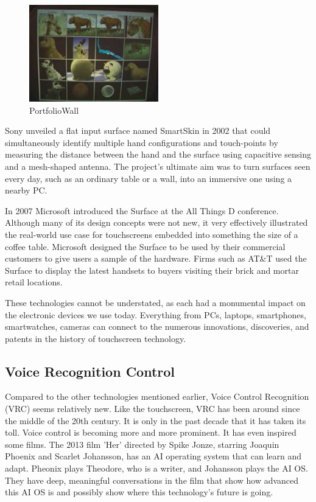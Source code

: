 \documentclass{article}
\begin{document}
\begin{figure}[!ht]
    \caption{PortfolioWall}
    \label{image:PFW}
    \centering
    \includegraphics[width=0.5\textwidth]{pics/pf_wall.jpg}
\end{figure}

Sony unveiled a flat input surface named SmartSkin in 2002 that could simultaneously identify multiple hand configurations and touch-points by measuring the distance between the hand and the surface using capacitive sensing and a mesh-shaped antenna.
The project’s ultimate aim was to turn surfaces seen every day, such as an ordinary table or a wall, into an immersive one using a nearby PC.

In 2007 Microsoft introduced the Surface at the All Things D conference. Although many of its design concepts were not new, it very effectively illustrated the real-world use case for touchscreens embedded into something the size of a coffee table. Microsoft designed the Surface to be used by their commercial customers to give users a sample of the hardware. Firms such as AT\&T used the Surface to display the latest handsets to buyers visiting their brick and mortar retail locations.

These technologies cannot be understated, as each had a monumental impact on the electronic devices we use today. Everything from PCs, laptops, smartphones, smartwatches, cameras can connect to the numerous innovations, discoveries, and patents in the history of touchscreen technology.
\cite{ref8}

\subsection{Voice Recognition Control}
Compared to the other technologies mentioned earlier, Voice Control Recognition (VRC) seems relatively new. Like the touchscreen, VRC has been around since the middle of the 20th century. It is only in the past decade that it has taken its toll. Voice control is becoming more and more prominent. It has even inspired some films. The 2013 film 'Her' directed by Spike Jonze, starring Joaquin Phoenix and Scarlet Johansson, has an AI operating system that can learn and adapt. Pheonix plays Theodore, who is a writer, and Johansson plays the AI OS. They have deep, meaningful conversations in the film that show how advanced this AI OS is and possibly show where this technology's future is going. 
\cite{ref9}
\end{document}

